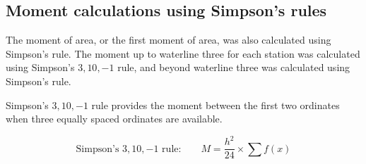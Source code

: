 \documentclass[12pt,a4paper,twoside]{report}
\begin{document}
\subsection{Moment calculations using Simpson's rules}
The moment of area, or the first moment of area, was also calculated
using Simpson's rule. The moment up to waterline three for each station
was calculated using Simpson's $3,10,-1$ rule, and beyond waterline three
was calculated using Simpson's rule.

\vspace{\baselineskip}\par\noindent Simpson's $3,10,-1$ rule provides the moment between the first two
ordinates when three equally spaced ordinates are available.

\begin{equation}
\text{Simpson's }3,10,-1\text{ rule:}
\qquad
M = \frac{h^2}{24}\times\sum f(x)
\end{equation}
\end{document}

